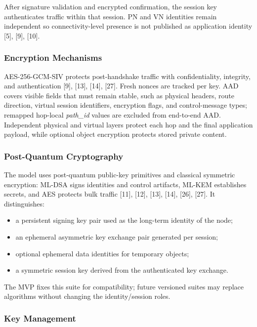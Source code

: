 \documentclass[12pt,a4paper]{article}
\begin{document}
After signature validation and encrypted confirmation, the session key authenticates traffic within that session. PN and VN identities remain independent so connectivity-level presence is not published as application identity [5], [9], [10].

\subsubsection{Encryption Mechanisms}

AES-256-GCM-SIV protects post-handshake traffic with confidentiality, integrity, and authentication [9], [13], [14], [27]. Fresh nonces are tracked per key. AAD covers visible fields that must remain stable, such as physical headers, route direction, virtual session identifiers, encryption flags, and control-message types; remapped hop-local \textit{path\_id} values are excluded from end-to-end AAD. Independent physical and virtual layers protect each hop and the final application payload, while optional object encryption protects stored private content.

\subsubsection{Post-Quantum Cryptography}

The model uses post-quantum public-key primitives and classical symmetric encryption: ML-DSA signs identities and control artifacts, ML-KEM establishes secrets, and AES protects bulk traffic [11], [12], [13], [14], [26], [27]. It distinguishes:

\begin{itemize}
    \item a persistent signing key pair used as the long-term identity of the node;
    \item an ephemeral asymmetric key exchange pair generated per session;
    \item optional ephemeral data identities for temporary objects;
    \item a symmetric session key derived from the authenticated key exchange.
\end{itemize}

The MVP fixes this suite for compatibility; future versioned suites may replace algorithms without changing the identity/session roles.

\subsubsection{Key Management}
\end{document}
